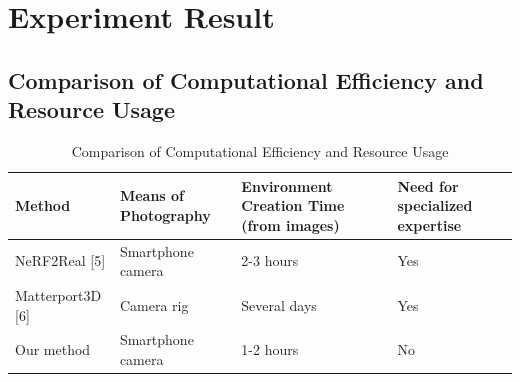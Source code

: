 \chapter{Experiment Result}
\label{chap:ExperimentResult}

\section{Comparison of Computational Efficiency and Resource Usage}
\label{sec:ComparisonofComputationalEfficiencyandResourceUsage}
\begin{table}[htbp]
    \caption{Comparison of Computational Efficiency and Resource Usage}
    \centering
    \begin{tabularx}{\textwidth}{|X|X|X|X|}
        \hline
        Method & Means of Photography & Environment Creation Time (from images) & Need for specialized expertise \\
        \hline
        NeRF2Real [5] & Smartphone camera & 2-3 hours & Yes \\
        \hline
        Matterport3D [6] & Camera rig & Several days & Yes \\
        \hline
        Our method & Smartphone camera & 1-2 hours & No \\
        \hline
    \end{tabularx}
    \label{tab:ComparisonofComputationalEfficiencyandResourceUsage}
\end{table}

